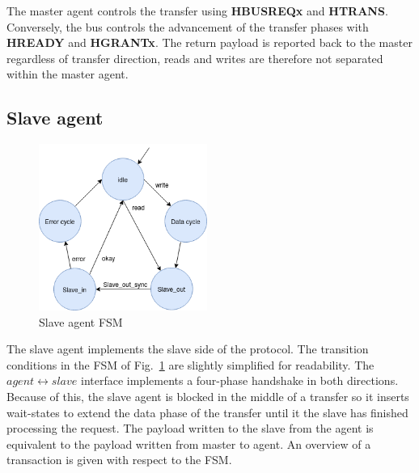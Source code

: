 The master agent controls the transfer using \textbf{HBUSREQx} and \textbf{HTRANS}. Conversely, the bus controls the advancement of the transfer phases with \textbf{HREADY} and \textbf{HGRANTx}. The return payload is reported back to the master regardless of transfer direction, reads and writes are therefore not separated within the master agent.  


\newpage
\subsection{Slave agent}
\label{sub:sagent}
\begin{figure}
\includegraphics[width=5.5cm]{figs/hw/sAgent_FSM.png}
\caption{Slave agent FSM}\label{fig:rsfsm}
\end{figure}  

The slave agent implements the slave side of the protocol. The transition conditions in the FSM of Fig.~\ref{fig:rsfsm} are slightly simplified for readability. 
The $agent\leftrightarrow slave$ interface implements a four-phase handshake in both directions. Because of this, the slave agent is blocked in the middle of a transfer so it inserts wait-states to extend the data phase of the transfer until it the slave has finished processing the request. The payload written to the slave from the agent is equivalent to the payload written from master to agent. An overview of a transaction is given with respect to the FSM.\par
 \vspace{1cm} 

